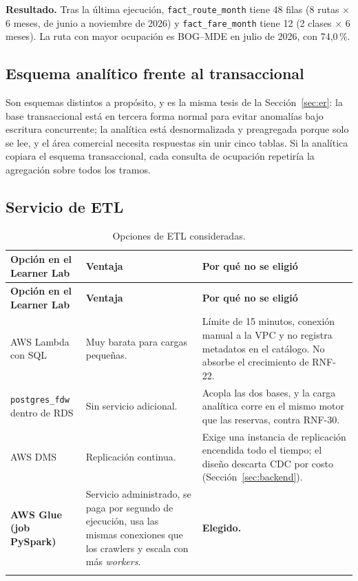 \documentclass[10pt,letterpaper]{article}
\begin{document}
\textbf{Resultado.} Tras la última ejecución, \texttt{fact\_route\_month} tiene 48 filas (8 rutas $\times$ 6 meses, de junio a noviembre de 2026) y \texttt{fact\_fare\_month} tiene 12 (2 clases $\times$ 6 meses). La ruta con mayor ocupación es BOG--MDE en julio de 2026, con 74,0\,\%.

\subsection{Esquema analítico frente al transaccional}
Son esquemas distintos a propósito, y es la misma tesis de la Sección~\ref{sec:er}: la base transaccional está en tercera forma normal para evitar anomalías bajo escritura concurrente; la analítica está desnormalizada y preagregada porque solo se lee, y el área comercial necesita respuestas sin unir cinco tablas. Si la analítica copiara el esquema transaccional, cada consulta de ocupación repetiría la agregación sobre todos los tramos.

\subsection{Servicio de ETL}
\begin{longtable}{@{}L{3.6cm} L{6.0cm} L{6.0cm}@{}}
\toprule \textbf{Opción en el Learner Lab} & \textbf{Ventaja} & \textbf{Por qué no se eligió} \\ \midrule \endfirsthead
\toprule \textbf{Opción en el Learner Lab} & \textbf{Ventaja} & \textbf{Por qué no se eligió} \\ \midrule \endhead
AWS Lambda con SQL & Muy barata para cargas pequeñas. & Límite de 15 minutos, conexión manual a la VPC y no registra metadatos en el catálogo. No absorbe el crecimiento de RNF-22. \\
\texttt{postgres\_fdw} dentro de RDS & Sin servicio adicional. & Acopla las dos bases, y la carga analítica corre en el mismo motor que las reservas, contra RNF-30. \\
AWS DMS & Replicación continua. & Exige una instancia de replicación encendida todo el tiempo; el diseño descarta CDC por costo (Sección~\ref{sec:backend}). \\
\textbf{AWS Glue (job PySpark)} & Servicio administrado, se paga por segundo de ejecución, usa las mismas conexiones que los crawlers y escala con más \emph{workers}. & \textbf{Elegido.} \\
\bottomrule
\caption{Opciones de ETL consideradas.}
\end{longtable}
\end{document}
